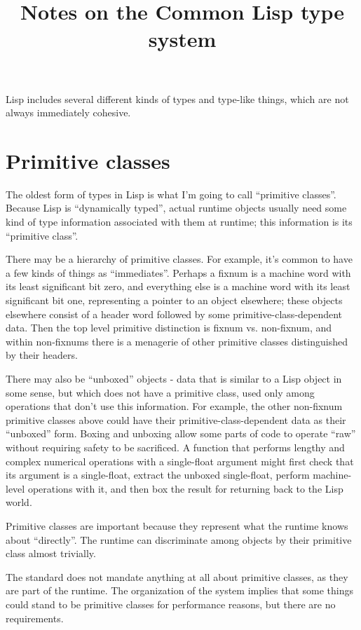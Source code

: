 \documentclass{article}
\begin{document}
\lstset{language=Lisp}

\title{Notes on the Common Lisp type system}

Lisp includes several different kinds of types and type-like things, which are not always immediately cohesive.



\section{Primitive classes}

The oldest form of types in Lisp is what I'm going to call ``primitive classes''. Because Lisp is ``dynamically typed'', actual runtime objects usually need some kind of type information associated with them at runtime; this information is its ``primitive class''.

There may be a hierarchy of primitive classes. For example, it's common to have a few kinds of things as ``immediates''. Perhaps a fixnum is a machine word with its least significant bit zero, and everything else is a machine word with its least significant bit one, representing a pointer to an object elsewhere; these objects elsewhere consist of a header word followed by some primitive-class-dependent data. Then the top level primitive distinction is fixnum vs. non-fixnum, and within non-fixnums there is a menagerie of other primitive classes distinguished by their headers.

There may also be ``unboxed'' objects - data that is similar to a Lisp object in some sense, but which does not have a primitive class, used only among operations that don't use this information. For example, the other non-fixnum primitive classes above could have their primitive-class-dependent data as their ``unboxed'' form. Boxing and unboxing allow some parts of code to operate ``raw'' without requiring safety to be sacrificed. A function that performs lengthy and complex numerical operations with a single-float argument might first check that its argument is a single-float, extract the unboxed single-float, perform machine-level operations with it, and then box the result for returning back to the Lisp world.

Primitive classes are important because they represent what the runtime knows about ``directly''. The runtime can discriminate among objects by their primitive class almost trivially.

The standard does not mandate anything at all about primitive classes, as they are part of the runtime. The organization of the system implies that some things could stand to be primitive classes for performance reasons, but there are no requirements.
\end{document}
